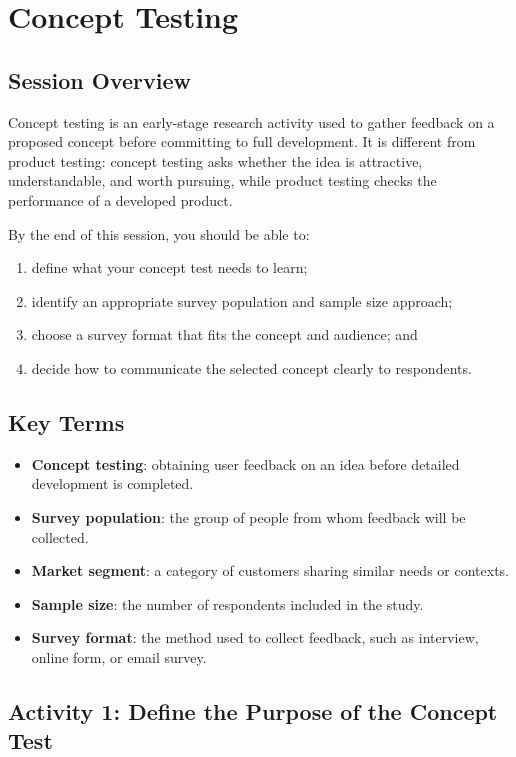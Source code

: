 \chapter{Concept Testing}

\section{Session Overview}

Concept testing is an early-stage research activity used to gather feedback on a proposed concept before committing to full development. It is different from product testing: concept testing asks whether the idea is attractive, understandable, and worth pursuing, while product testing checks the performance of a developed product.

By the end of this session, you should be able to:
\begin{enumerate}
    \item define what your concept test needs to learn;
    \item identify an appropriate survey population and sample size approach;
    \item choose a survey format that fits the concept and audience; and
    \item decide how to communicate the selected concept clearly to respondents.
\end{enumerate}

\section{Key Terms}

\begin{itemize}
    \item \textbf{Concept testing}: obtaining user feedback on an idea before detailed development is completed.
    \item \textbf{Survey population}: the group of people from whom feedback will be collected.
    \item \textbf{Market segment}: a category of customers sharing similar needs or contexts.
    \item \textbf{Sample size}: the number of respondents included in the study.
    \item \textbf{Survey format}: the method used to collect feedback, such as interview, online form, or email survey.
\end{itemize}

\section{Activity 1: Define the Purpose of the Concept Test}

